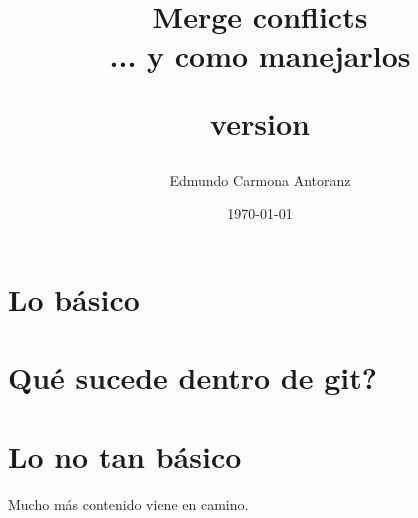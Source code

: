 \documentclass{report}
\title{Merge conflicts \\
	\large ... y como manejarlos

	\small version \versionnumber}
\author{Edmundo Carmona Antoranz}
\date{\today}
\begin{document}
\begin{titlepage}
\maketitle
\end{titlepage}


\clearpage


\clearpage


\clearpage


\clearpage


\clearpage


\clearpage

\chapter{Lo básico}

\clearpage


\clearpage


\clearpage


\clearpage


\clearpage


\clearpage


\clearpage


\chapter{Qué sucede dentro de git?}

\clearpage

\chapter{Lo no tan básico}

\clearpage

Mucho más contenido viene en camino.


\end{document}
